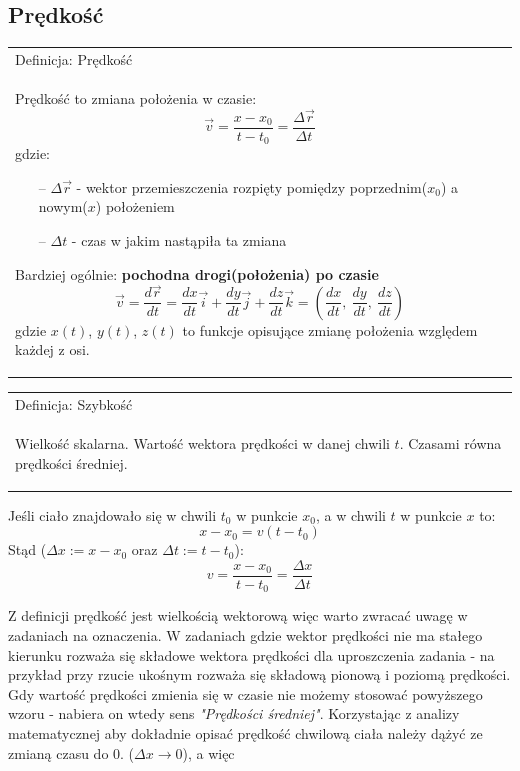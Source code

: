 \documentclass[a4paper]{article}
\newenvironment{definition}[1][title]
    {
        \begin{center}
        \begin{tabular}{|p{1\textwidth}|}
        \hline
            Definicja: #1\\[2ex]
        \begin{em}
        \Large
    }
    { 
        \end{em}
        \\\hline
        \end{tabular} 
        \end{center}
    }
\begin{document}
    \subsection{\LARGE Prędkość}
        \Large
        \begin{definition}[Prędkość]
            Prędkość to zmiana położenia w czasie:
            \[\vec{v} = \frac{x - x_0}{t - t_0} = \frac{\Delta\vec{r}}{\Delta t}\]
            gdzie:
            \begin{itemize}
                \item[--] $\Delta\vec{r}$ - wektor przemieszczenia rozpięty pomiędzy poprzednim($x_0$) a nowym($x$) położeniem
                \item[--] $\Delta t$ - czas w jakim nastąpiła ta zmiana 
            \end{itemize}
            Bardziej ogólnie: \textbf{pochodna drogi(położenia) po czasie} 
            \[\vec{v} = \frac{d\vec{r}}{dt} = \frac{dx}{dt}\vec{i} + \frac{dy}{dt}\vec{j} + \frac{dz}{dt}\vec{k} 
            = \left (\frac{dx}{dt},\ \frac{dy}{dt},\ \frac{dz}{dt} \right )\]
            gdzie $x(t)$, $y(t)$, $z(t)$ to funkcje opisujące zmianę położenia względem każdej z osi.
        \end{definition}
        \begin{definition}[Szybkość]
            Wielkość skalarna. Wartość wektora prędkości w danej chwili $t$. Czasami równa prędkości średniej.
        \end{definition}
        Jeśli ciało znajdowało się w chwili $t_0$ w punkcie $x_0$, a w chwili $t$ w punkcie $x$ to:
        \[x - x_0 = v(t - t_0) \]
        Stąd ($\Delta x := x - x_0$ oraz $\Delta t := t - t_0$):
        \[v = \frac{x - x_0}{t - t_0} = \frac{\Delta x}{\Delta t}\]
        
        Z definicji prędkość jest wielkością wektorową więc warto zwracać uwagę w zadaniach na oznaczenia. W zadaniach gdzie wektor prędkości nie ma stałego kierunku rozważa się składowe wektora prędkości dla uproszczenia zadania - na przykład przy rzucie ukośnym rozważa się składową pionową i poziomą prędkości.\\

        Gdy wartość prędkości zmienia się w czasie nie możemy stosować powyższego wzoru - nabiera on wtedy sens \textit{"Prędkości średniej"}. 
        Korzystając z analizy matematycznej aby dokładnie opisać prędkość chwilową ciała należy dążyć ze zmianą czasu do 0. ($\Delta x\rightarrow 0$), a więc
\end{document}

